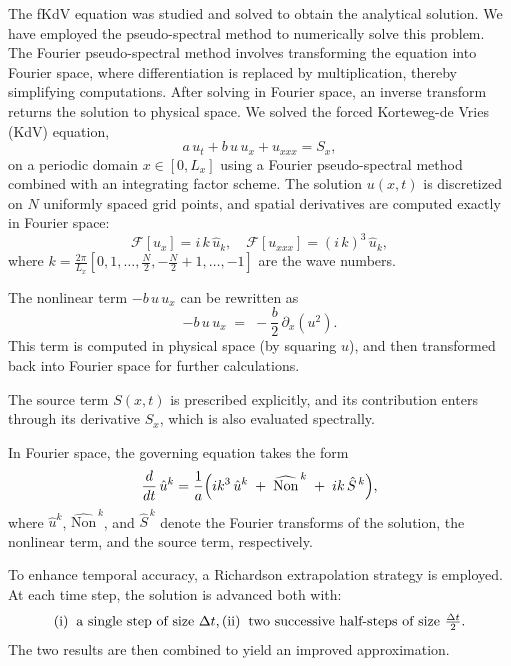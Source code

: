 \documentclass[%
 aip,
 amsmath,amssymb,
 reprint,%
]{revtex4-1}
\begin{document}
The  fKdV equation was studied and solved to obtain the analytical solution. We have employed the pseudo-spectral method to numerically solve this problem. The Fourier pseudo-spectral method \cite{r29} involves transforming the equation into Fourier space, where differentiation is replaced by multiplication, thereby simplifying computations. After solving in Fourier space, an inverse transform returns the solution to physical space.
We solved the forced Korteweg-de Vries (KdV) equation,
\begin{equation*}
a\,u_t + b\,u\,u_x + u_{xxx} = S_x,
\end{equation*}
on a periodic domain $x \in [0, L_x]$ using a Fourier pseudo-spectral method combined with an integrating factor scheme.
The solution $u(x,t)$ is discretized on $N$ uniformly spaced grid points, and spatial derivatives are computed exactly in Fourier space:
\begin{equation*}
\mathcal{F}[u_x] = i\,k\,\hat{u}_k, 
\quad
\mathcal{F}[u_{xxx}] = (i\,k)^3\,\hat{u}_k,
\end{equation*}
where $k = \frac{2\pi}{L_x}\left[0,1,\dots,\frac{N}{2}, -\frac{N}{2}+1, \dots, -1\right]$ are the wave numbers.



The nonlinear term 
\(-b\,u\,u_x\) 
can be rewritten as
\[
-b\,u\,u_x \;=\; -\frac{b}{2}\,\partial_x\!\left(u^{2}\right).
\]
This term is computed in physical space (by squaring \(u\)), and then transformed
back into Fourier space for further calculations.

The source term \(S(x,t)\) is prescribed explicitly, and its contribution
enters through its derivative \(S_x\), which is also evaluated spectrally.

  
In Fourier space, the governing equation takes the form
\[
\frac{d}{dt}\,\hat{u}^k
= \frac{1}{a}\Bigl( i k^{3}\,\hat{u}^k \;+\; \widehat{\text{Non}}^{\,k} \;+\; i k\,\hat{S}^{\,k} \Bigr),
\]
where \(\hat{u}^k\), \(\widehat{\text{Non}}^{\,k}\), and \(\hat{S}^{\,k}\) denote the Fourier transforms of the solution,
the nonlinear term, and the source term, respectively.



\vspace{0.5em}
To enhance temporal accuracy, a Richardson extrapolation strategy is employed.
At each time step, the solution is advanced both with:
\[
\text{(i)} \;\; \text{a single step of size } \Delta t,
\qquad\\
\text{(ii)} \;\; \text{two successive half-steps of size } \tfrac{\Delta t}{2}.
\]
The two results are then combined to yield an improved approximation.\\
\end{document}
